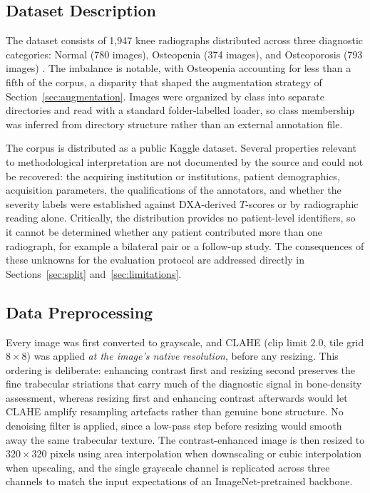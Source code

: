 \documentclass[journal]{IEEEtran}
\begin{document}
\subsection{Dataset Description}
\label{sec:dataset}
The dataset consists of 1,947 knee radiographs distributed across three
diagnostic categories: Normal (780 images), Osteopenia (374 images), and
Osteoporosis (793 images) \cite{gobara2024multiclass}. The imbalance is
notable, with Osteopenia accounting for less than a fifth of the corpus, a
disparity that shaped the augmentation strategy of
Section~\ref{sec:augmentation}. Images were organized by class into separate
directories and read with a standard folder-labelled loader, so class
membership was inferred from directory structure rather than an external
annotation file.

The corpus is distributed as a public Kaggle dataset. Several properties
relevant to methodological interpretation are not documented by the source and
could not be recovered: the acquiring institution or institutions, patient
demographics, acquisition parameters, the qualifications of the annotators, and
whether the severity labels were established against DXA-derived $T$-scores or
by radiographic reading alone. Critically, the distribution provides no
patient-level identifiers, so it cannot be determined whether any patient
contributed more than one radiograph, for example a bilateral pair or a
follow-up study. The consequences of these unknowns for the evaluation protocol
are addressed directly in Sections~\ref{sec:split} and~\ref{sec:limitations}.

\subsection{Data Preprocessing}
\label{sec:preprocessing}
Every image was first converted to grayscale, and CLAHE
\cite{zuiderveld1994contrast} (clip limit $2.0$, tile grid $8 \times 8$) was
applied \emph{at the image's native resolution}, before any resizing. This
ordering is deliberate: enhancing contrast first and resizing second preserves
the fine trabecular striations that carry much of the diagnostic signal in
bone-density assessment, whereas resizing first and enhancing contrast
afterwards would let CLAHE amplify resampling artefacts rather than genuine bone
structure. No denoising filter is applied, since a low-pass step before resizing
would smooth away the same trabecular texture. The contrast-enhanced image is
then resized to $320 \times 320$ pixels using area interpolation when downscaling
or cubic interpolation when upscaling, and the single grayscale channel is
replicated across three channels to match the input expectations of an
ImageNet-pretrained backbone.
\end{document}
